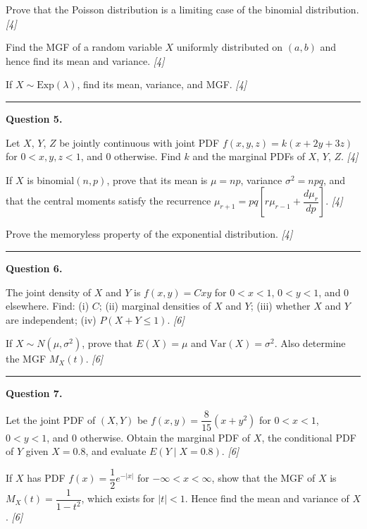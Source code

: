 \documentclass[11pt,a4paper]{article}
\newcommand{\pts}[1]{\hfill   \textit{[#1]}}
\begin{document}
\begin{parts}
  \item Prove that the Poisson distribution is a limiting case of the binomial distribution. \pts{4}
  \item Find the MGF of a random variable $X$ uniformly distributed on $(a, b)$ and hence find its mean and variance. \pts{4}
  \item If $X \sim  \text{Exp}(\lambda)$, find its mean, variance, and MGF. \pts{4}
\end{parts}

\medskip\rule{\linewidth}{0.2pt}

\medskip


\noindent   \textbf{Question 5.}

\begin{parts}
  \item Let $X$, $Y$, $Z$ be jointly continuous with joint PDF $f(x,y,z) = k(x + 2y + 3z)$ for $0 < x, y, z < 1$, and $0$ otherwise. Find $k$ and the marginal PDFs of $X$, $Y$, $Z$. \pts{4}
  \item If $X$ is binomial$(n, p)$, prove that its mean is $\mu = np$, variance $\sigma^2 = npq$, and that the central moments satisfy the recurrence $\mu_{r+1} = pq\left[r\mu_{r-1} + \dfrac{d\mu_r}{dp}\right]$. \pts{4}
  \item Prove the memoryless property of the exponential distribution. \pts{4}
\end{parts}

\medskip\rule{\linewidth}{0.2pt}

\medskip


\noindent   \textbf{Question 6.}

\begin{parts}
  \item The joint density of $X$ and $Y$ is $f(x,y) = Cxy$ for $0 < x < 1$, $0 < y < 1$, and $0$ elsewhere. Find: (i) $C$; (ii) marginal densities of $X$ and $Y$; (iii) whether $X$ and $Y$ are independent; (iv) $P(X + Y \le 1)$. \pts{6}
  \item If $X \sim N(\mu, \sigma^2)$, prove that $E(X) = \mu$ and $ \text{Var}(X) = \sigma^2$. Also determine the MGF $M_X(t)$. \pts{6}
\end{parts}

\medskip\rule{\linewidth}{0.2pt}

\medskip


\noindent   \textbf{Question 7.}

\begin{parts}
  \item Let the joint PDF of $(X,Y)$ be $f(x,y) = \dfrac{8}{15}(x + y^2)$ for $0 < x < 1$, $0 < y < 1$, and $0$ otherwise. Obtain the marginal PDF of $X$, the conditional PDF of $Y$ given $X = 0.8$, and evaluate $E(Y \mid X = 0.8)$. \pts{6}
  \item If $X$ has PDF $f(x) = \dfrac{1}{2}e^{-|x|}$ for $-\infty < x < \infty$, show that the MGF of $X$ is $M_X(t) = \dfrac{1}{1-t^2}$, which exists for $|t| < 1$. Hence find the mean and variance of $X$. \pts{6}
\end{parts}
\end{document}
